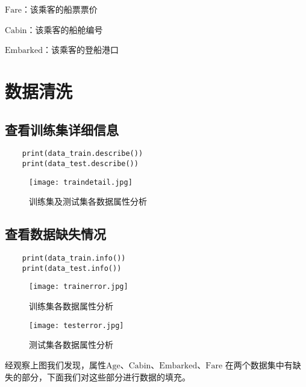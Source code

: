 \documentclass[AutoFakeBold]{LZUThesis}
\begin{document}
$\mathrm{Fare}$：该乘客的船票票价

$\mathrm{Cabin}$：该乘客的船舱编号

$\mathrm{Embarked}$：该乘客的登船港口
\chapter{数据清洗}
\section{查看训练集详细信息}
\begin{lstlisting}
    print(data_train.describe())  
    print(data_test.describe())  
\end{lstlisting}
    \begin{figure}[htbp]
        \centering
        \texttt{[image: traindetail.jpg]}
        \caption{训练集及测试集各数据属性分析}
    \end{figure}
\section{查看数据缺失情况}
\begin{lstlisting}
    print(data_train.info())  
    print(data_test.info())
\end{lstlisting}
    \begin{figure}[htbp]
        \centering
        \texttt{[image: trainerror.jpg]}
        \caption{训练集各数据属性分析}
    \end{figure}
\begin{figure}[htbp]
    \centering
    \texttt{[image: testerror.jpg]}
    \caption{测试集各数据属性分析}
\end{figure}
    经观察上图我们发现，属性$\mathrm{Age}$、$\mathrm{Cabin}$、$\mathrm{Embarked}$、$\mathrm{Fare}$
    在两个数据集中有缺失的部分，下面我们对这些部分进行数据的填充。
\end{document}
